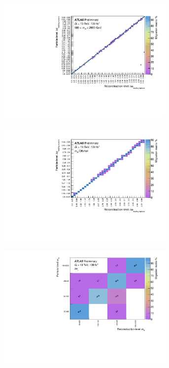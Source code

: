 \begin{figure}[htb]
  \begin{subfigure}{.49\textwidth}\centering\includegraphics[width = 0.95\textwidth]{Figures/m4l/UnfoldingStudies/v014_matrices/deltaPhiLeadingLeptons_m4l180-2000Matrix.pdf}\end{subfigure}
  \begin{subfigure}{.49\textwidth}\centering\includegraphics[width = 0.95\textwidth]{Figures/m4l/UnfoldingStudies/v014_matrices/deltaPhiLeadingLeptons_m4loffshellMatrix.pdf}\end{subfigure}
  \begin{subfigure}{.49\textwidth}\centering\includegraphics[width = 0.95\textwidth]{Figures/m4l/UnfoldingStudies/v014_matrices/deltaPhiLeadingLeptons_m4lMatrix.pdf}\end{subfigure}

\end{figure}

